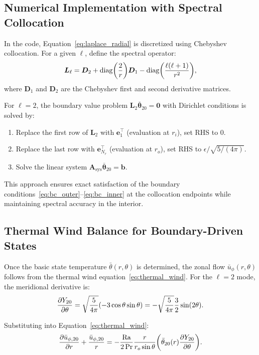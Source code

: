 \documentclass[11pt]{article}
\numberwithin{equation}{section}
\begin{document}
\subsection{Numerical Implementation with Spectral Collocation}

In the code, Equation~\eqref{eq:laplace_radial} is discretized using Chebyshev collocation. For a given $\ell$, define the spectral operator:
\begin{equation}
  \bm{L}_\ell = \bm{D}_2 + \mathrm{diag}\qty(\frac{2}{r}) \bm{D}_1 - \mathrm{diag}\qty(\frac{\ell(\ell+1)}{r^2}),
  \label{eq:spectral_laplace}
\end{equation}
where $\bm{D}_1$ and $\bm{D}_2$ are the Chebyshev first and second derivative matrices.

For $\ell=2$, the boundary value problem $\bm{L}_2 \bar{\bm{\theta}}_{20} = \bm{0}$ with Dirichlet conditions is solved by:
\begin{enumerate}
  \item Replace the first row of $\bm{L}_2$ with $\bm{e}_1^\top$ (evaluation at $r_i$), set RHS to $0$.
  \item Replace the last row with $\bm{e}_{N_r}^\top$ (evaluation at $r_o$), set RHS to $\epsilon/\sqrt{5/(4\pi)}$.
  \item Solve the linear system $\bm{A}_{\text{sys}} \bar{\bm{\theta}}_{20} = \bm{b}$.
\end{enumerate}

This approach ensures exact satisfaction of the boundary conditions~\eqref{eq:bc_outer}--\eqref{eq:bc_inner} at the collocation endpoints while maintaining spectral accuracy in the interior.

\subsection{Thermal Wind Balance for Boundary-Driven States}

Once the basic state temperature $\bar{\theta}(r,\theta)$ is determined, the zonal flow $\bar{u}_\phi(r,\theta)$ follows from the thermal wind equation~\eqref{eq:thermal_wind}. For the $\ell=2$ mode, the meridional derivative is:
\begin{equation}
  \pdv{Y_{20}}{\theta} = \sqrt{\frac{5}{4\pi}} \qty(-3 \cos\theta \sin\theta) = -\sqrt{\frac{5}{4\pi}} \frac{3}{2} \sin(2\theta).
  \label{eq:dY20_dtheta}
\end{equation}

Substituting into Equation~\eqref{eq:thermal_wind}:
\begin{equation}
  \pdv{\bar{u}_{\phi,20}}{r} + \frac{\bar{u}_{\phi,20}}{r} = -\frac{\mathrm{Ra}}{2\,\mathrm{Pr}} \frac{r}{r_o \sin\theta} \qty( \bar{\theta}_{20}(r) \pdv{Y_{20}}{\theta} ).
  \label{eq:thermal_wind_l2}
\end{equation}
\end{document}
